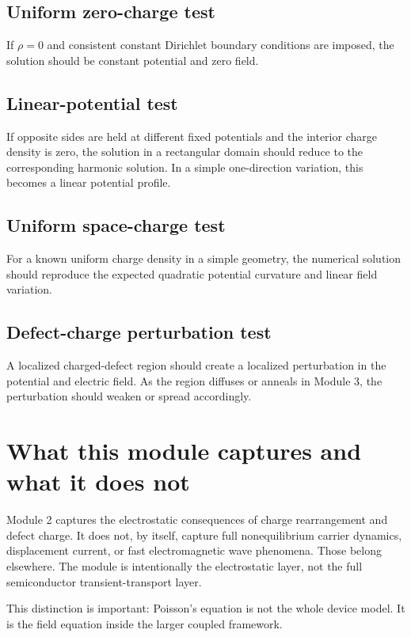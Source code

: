 \documentclass[11pt]{article}
\begin{document}
\subsection{Uniform zero-charge test}

If $\rho=0$ and consistent constant Dirichlet boundary conditions are imposed, the solution should be constant potential and zero field.

\subsection{Linear-potential test}

If opposite sides are held at different fixed potentials and the interior charge density is zero, the solution in a rectangular domain should reduce to the corresponding harmonic solution. In a simple one-direction variation, this becomes a linear potential profile.

\subsection{Uniform space-charge test}

For a known uniform charge density in a simple geometry, the numerical solution should reproduce the expected quadratic potential curvature and linear field variation.

\subsection{Defect-charge perturbation test}

A localized charged-defect region should create a localized perturbation in the potential and electric field. As the region diffuses or anneals in Module 3, the perturbation should weaken or spread accordingly.

\section{What this module captures and what it does not}

Module 2 captures the electrostatic consequences of charge rearrangement and defect charge. It does not, by itself, capture full nonequilibrium carrier dynamics, displacement current, or fast electromagnetic wave phenomena. Those belong elsewhere. The module is intentionally the electrostatic layer, not the full semiconductor transient-transport layer.

This distinction is important: Poisson's equation is not the whole device model. It is the field equation inside the larger coupled framework.
\end{document}

